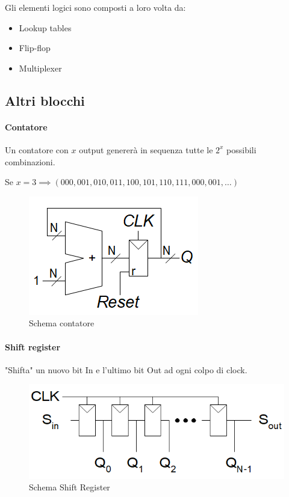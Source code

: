 \documentclass{article}
\begin{document}
Gli elementi logici sono composti a loro volta da:
\begin{itemize}
    \item Lookup tables
    \item Flip-flop
    \item Multiplexer
\end{itemize}

\newpage

\subsection{Altri blocchi}

\paragraph{Contatore}

Un contatore con $x$ output genererà in sequenza tutte le $2^x$ possibili combinazioni.

\vspace{3pt}

Se $x=3 \implies  (000,001,010,011,100,101,110,111,000,001,\ldots)$

\begin{figure}[ht]
    \centering
    \includegraphics[width=0.5\linewidth]{counter.png}
    \caption{Schema contatore}
    \label{fig:counter}
\end{figure}

\paragraph{Shift register}

"Shifta" un nuovo bit In e l'ultimo bit Out ad ogni colpo di clock.

\begin{figure}[ht]
    \centering
    \includegraphics[width=0.7\linewidth]{shift_register.png}
    \caption{Schema Shift Register}
    \label{fig:shift_register}
\end{figure}
\end{document}
